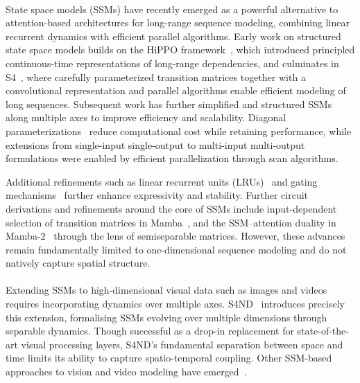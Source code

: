 \documentclass{article}
\begin{document}
\paragraph{}State space models (SSMs) have recently emerged as a powerful alternative to attention-based architectures for long-range sequence modeling, combining linear recurrent dynamics with efficient parallel algorithms. Early work on structured state space models builds on the HiPPO framework~\citep{gu2020}, which introduced principled continuous-time representations of long-range dependencies, and culminates in S4~\citep{gu2022}, where carefully parameterized transition matrices together with a convolutional representation and parallel algorithms enable efficient modeling of long sequences. Subsequent work has further simplified and structured SSMs along multiple axes to improve efficiency and scalability. Diagonal parameterizations~\citep{gu2022s4d, gupta2022} reduce computational cost while retaining performance, while extensions from single-input single-output to multi-input multi-output~\citep{smith2023s5} formulations were enabled by efficient parallelization through scan algorithms.

Additional refinements such as linear recurrent units (LRUs)~\citep{orvieto2023} and gating mechanisms~\citep{mehta2023} further enhance expressivity and stability. Further circuit derivations and refinements around the core of SSMs include input-dependent selection of transition matrices in Mamba~\citep{gu2023}, and the SSM--attention duality in Mamba-2~\citep{dao2024} through the lens of semiseparable matrices. However, these advances remain fundamentally limited to one-dimensional sequence modeling and do not natively capture spatial structure.

\paragraph{}Extending SSMs to high-dimensional visual data such as images and videos requires incorporating dynamics over multiple axes. S4ND~\citep{nguyen2022} introduces precisely this extension, formalising SSMs evolving over multiple dimensions through separable dynamics. Though successful as a drop-in replacement for state-of-the-art visual processing layers, S4ND's fundamental separation between space and time limits its ability to capture spatio-temporal coupling. Other SSM-based approaches to vision and video modeling have emerged~\citep{zhu2024,li2024videomamba,li2024mamband}.
\end{document}
